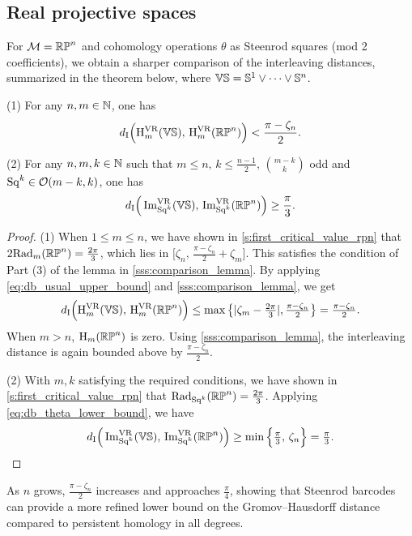 \subsection{Real projective spaces}\label{ss:distance_estimate_rpn}

For \(\mathcal{M} = \mathbb{RP}^n\) and cohomology operations \(\theta\) as Steenrod squares (mod 2 coefficients), we obtain a sharper comparison of the interleaving distances, summarized in the theorem below, where \(\mathbb{VS} = \mathbb{S}^1 \vee \dots \vee \mathbb{S}^n\).

\medskip\theorem
(1) For any \(n,m \in \mathbb{N}\), one has
\[
d_{\mathrm{I}}\Big(\mathrm{H}^{\mathrm{VR}}_m(\mathbb{VS}),\, \mathrm{H}^{\mathrm{VR}}_m(\mathbb{RP}^n)\Big) < \frac{\pi-\zeta_n}{2}.
\]

(2) For any \(n,m,k \in \mathbb{N}\) such that $m \leq n,\, k \leq \tfrac{n-1}{2},\, \binom{m-k}{k}$ odd and $\mathrm{Sq}^k\in \mathcal{O}(m-k, k)$, one has
\[
d_{\mathrm{I}}\Big(\operatorname{Im}_{\mathrm{Sq}^k}^{\mathrm{VR}}(\mathbb{VS}),\, \operatorname{Im}_{\mathrm{Sq}^k}^{\mathrm{VR}}(\mathbb{RP}^n)\Big) \geq \frac{\pi}{3}.
\]

\begin{proof}
    (1) %
    When $1 \leq m \leq n$, we have shown in \cref{s:first_critical_value_rpn} that
    $2\mathrm{Rad}_{m}(\mathbb{RP}^n) = \tfrac{2\pi}{3}$, which lies in $\big[\zeta_n,\, \tfrac{\pi - \zeta_n}{2}+\zeta_m\big]$.
    This satisfies the condition of Part (3) of the lemma in \cref{sss:comparison_lemma}.
	By applying \cref{eq:db_usual_upper_bound} and \cref{sss:comparison_lemma}, we get
	\[d_{\mathrm{I}}\Big(\mathrm{H}^{\mathrm{VR}}_m(\mathbb{VS}),\, \mathrm{H}^{\mathrm{VR}}_m(\mathbb{RP}^n)\Big)
    \leq
    \max \big\{ |\zeta_m  - \tfrac{2\pi}{3} |, \tfrac{\pi - \zeta_n}{2} \big\}
    = \tfrac{\pi - \zeta_n}{2}.\]
    When $m > n$, $\mathrm{H}_m(\mathbb{RP}^n)$ is zero.
    Using \cref{sss:comparison_lemma}, the interleaving distance is again bounded above by $\tfrac{\pi - \zeta_n}{2}$.

    (2) With $m,k$ satisfying the required conditions, we have shown in \cref{s:first_critical_value_rpn} that
	$\mathrm{Rad}_{\mathrm{Sq}^k}(\mathbb{RP}^n) = \tfrac{2\pi}{3}$.
    Applying \cref{eq:db_theta_lower_bound}, we have
	\[d_{\mathrm{I}}\Big(\operatorname{Im}_{\mathrm{Sq}^k}^{\mathrm{VR}}(\mathbb{VS}),\, \operatorname{Im}_{\mathrm{Sq}^k}^{\mathrm{VR}}(\mathbb{RP}^n)\Big)
	\geq \min\Big\{\tfrac{\pi}{3},\, \zeta_n\Big\}
	= \tfrac{\pi}{3}.\qedhere
    \]
\end{proof}

As \(n\) grows, \(\tfrac{\pi - \zeta_n}{2}\) increases and approaches \(\tfrac{\pi}{4}\), showing that Steenrod barcodes can provide a more refined lower bound on the Gromov--Hausdorff distance compared to persistent homology in all degrees.